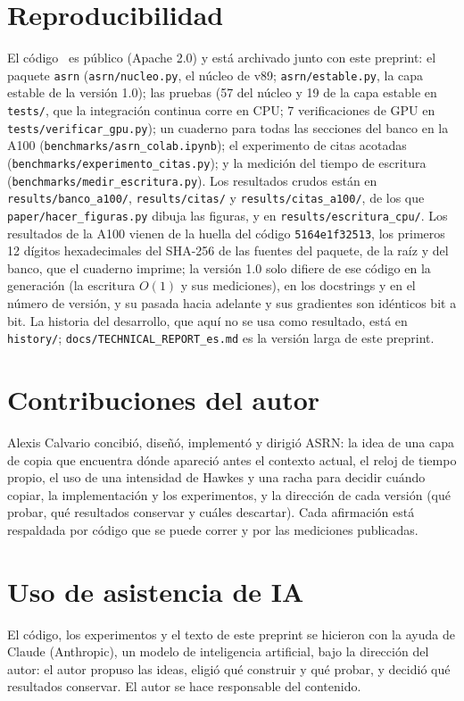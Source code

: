 \documentclass[11pt]{article}
\begin{document}
\section*{Reproducibilidad}
El código~\cite{calvario2026asrncode} es público (Apache 2.0) y está archivado junto con este preprint: el paquete
\texttt{asrn} (\nolinkurl{asrn/nucleo.py}, el núcleo de v89; \nolinkurl{asrn/estable.py}, la capa estable de la versión
1.0); las pruebas (57 del núcleo y 19 de la capa estable en \nolinkurl{tests/}, que la integración continua corre en
CPU; 7 verificaciones de GPU en \nolinkurl{tests/verificar_gpu.py}); un cuaderno para todas las secciones del banco en
la A100 (\nolinkurl{benchmarks/asrn_colab.ipynb}); el experimento de citas acotadas
(\nolinkurl{benchmarks/experimento_citas.py}); y la medición del tiempo de escritura
(\nolinkurl{benchmarks/medir_escritura.py}). Los resultados crudos están en \nolinkurl{results/banco_a100/},
\nolinkurl{results/citas/} y \nolinkurl{results/citas_a100/}, de los que \nolinkurl{paper/hacer_figuras.py} dibuja las
figuras, y en \nolinkurl{results/escritura_cpu/}. Los resultados de la A100 vienen de la huella del código
\texttt{5164e1f32513}, los primeros 12 dígitos hexadecimales del SHA-256 de las fuentes del paquete, de la raíz y del
banco, que el cuaderno imprime; la versión 1.0 solo difiere de ese código en la generación (la escritura $O(1)$ y sus
mediciones), en los docstrings y en el número de versión, y su pasada hacia adelante y sus gradientes son idénticos bit a
bit. La historia del
desarrollo, que aquí no se usa como resultado, está en \nolinkurl{history/}; \nolinkurl{docs/TECHNICAL_REPORT_es.md} es
la versión larga de este preprint.

\section*{Contribuciones del autor}
Alexis Calvario concibió, diseñó, implementó y dirigió ASRN: la idea de una capa de copia que encuentra dónde apareció
antes el contexto actual, el reloj de tiempo propio, el uso de una intensidad de Hawkes y una racha para decidir cuándo
copiar, la implementación y los experimentos, y la dirección de cada versión (qué probar, qué resultados conservar y
cuáles descartar). Cada afirmación está respaldada por código que se puede correr y por las mediciones publicadas.

\section*{Uso de asistencia de IA}
El código, los experimentos y el texto de este preprint se hicieron con la ayuda de Claude (Anthropic), un modelo de
inteligencia artificial, bajo la dirección del autor: el autor propuso las ideas, eligió qué construir y qué probar, y
decidió qué resultados conservar. El autor se hace responsable del contenido.
\end{document}
